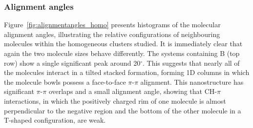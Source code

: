 \subsubsection{Alignment angles}
Figure~\ref{fig:alignmentangles_homo} presents histograms of the molecular alignment angles, illustrating the relative configurations of neighbouring molecules within the homogeneous clusters studied. It is immediately clear that again the two molecule sizes behave differently. The systems containing B (top row) show a single significant peak around 20$^{\circ}$.  This suggests that nearly all of the molecules interact in a tilted stacked formation, forming 1D columns in which the molecule bowls possess a face-to-face $\pi$-$\pi$ alignment. This nanostructure has significant $\pi$-$\pi$ overlaps and a small alignment angle, showing that CH-$\pi$ interactions, in which the positively charged rim of one molecule is almost perpendicular to the negative region and the bottom of the other molecule in a T-shaped configuration, are weak.  


